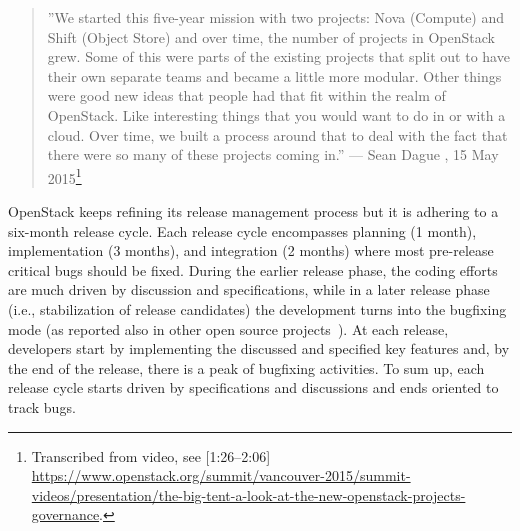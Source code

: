 \documentclass[dvipsnames]{interact}
\theoremstyle{plain}\newtheorem{theorem}{Theorem}[section]
\theoremstyle{definition}
\theoremstyle{remark}
\begin{document}
\begin{quotation}
\footnotesize
''We started this five-year mission with two projects: Nova (Compute) and Shift (Object Store) and over time, the number of projects in OpenStack grew. Some of this were parts of the existing projects that split out to have their own separate teams and became a little more modular. Other things were good new ideas that people had that fit within the realm of OpenStack. Like interesting things that you would want to do in or with a cloud. Over time, we built a process around that to deal with the fact that there were so many of these projects coming in.'' --- Sean Dague , 15 May 2015\footnote{Transcribed from video, see [1:26--2:06] \url{https://www.openstack.org/summit/vancouver-2015/summit-videos/presentation/the-big-tent-a-look-at-the-new-openstack-projects-governance}.}
\end{quotation}

OpenStack keeps refining its release management process but it is adhering to a six-month release cycle. Each release cycle encompasses planning (1 month), implementation (3 months), and integration (2 months) where most pre-release critical bugs should be fixed. During the earlier release phase, the coding efforts are much driven by discussion and specifications, while in a later release phase (i.e., stabilization of release candidates) the development turns into the bugfixing mode (as reported also in other open source projects~\cite{MartinezRomoRobles_et_al2008,RossiRusso_et_al2009,MichlmayrFitzgerald_et_al2015}). At each release, developers start by implementing the discussed and specified key features and, by the end of the release, there is a peak of bugfixing activities. To sum up, each release cycle starts driven by specifications and discussions and ends oriented to track bugs.    
\end{document}
